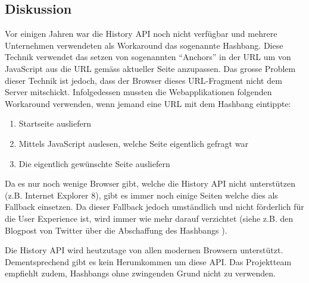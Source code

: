 \subsection*{Diskussion}
Vor einigen Jahren war die History API noch nicht verfügbar und mehrere Unternehmen verwendeten als Workaround das sogenannte \gls{Hashbang}. Diese Technik verwendet das setzen von sogenannten ``Anchors'' in der URL um von JavaScript aus die \gls{URL} gemäss aktueller Seite anzupassen. Das grosse Problem dieser Technik ist jedoch, dass der Browser dieses \gls{URL}-Fragment nicht dem Server mitschickt.
Infolgedessen mussten die Webapplikationen folgenden Workaround verwenden, wenn jemand eine URL mit dem Hashbang eintippte:

\begin{enumerate}
	\item Startseite ausliefern
	\item Mittels JavaScript auslesen, welche Seite eigentlich gefragt war
	\item Die eigentlich gewünschte Seite ausliefern
\end{enumerate}

Da es nur noch wenige Browser gibt, welche die History API nicht unterstützen (z.B. Internet Explorer 8), gibt es immer noch einige Seiten welche dies als Fallback einsetzen. Da dieser Fallback jedoch umständlich und nicht förderlich für die User Experience ist, wird immer wie mehr darauf verzichtet (siehe z.B. den Blogpost von Twitter über die Abschaffung des Hashbangs \cite{twitterAbandonsHashbangs}).

Die History API wird heutzutage von allen modernen Browsern unterstützt. Dementsprechend gibt es kein Herumkommen um diese API. Das Projektteam
empfiehlt zudem, Hashbangs ohne zwingenden Grund nicht zu verwenden.